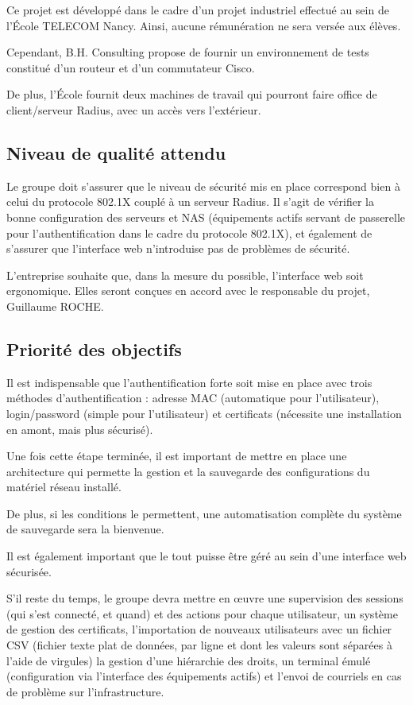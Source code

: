 Ce projet est développé dans le cadre d'un projet industriel effectué au sein de l'École TELECOM Nancy. Ainsi, aucune rémunération ne sera versée aux élèves.

Cependant, B.H. Consulting propose de fournir un environnement de tests constitué d'un routeur et d'un commutateur Cisco.

De plus, l'École fournit deux machines de travail qui pourront faire office de client/serveur Radius, avec un accès vers l'extérieur.

\subsection{Niveau de qualité attendu}

Le groupe doit s'assurer que le niveau de sécurité mis en place correspond bien à celui du protocole 802.1X couplé à un serveur Radius. Il s'agit de vérifier la bonne configuration des serveurs et NAS (équipements actifs servant de passerelle pour l'authentification dans le cadre du protocole 802.1X), et également de s'assurer que l'interface web n'introduise pas de problèmes de sécurité.

L'entreprise souhaite que, dans la mesure du possible, l'interface web soit ergonomique. Elles seront conçues en accord avec le responsable du projet, Guillaume ROCHE.

\subsection{Priorité des objectifs}

Il est indispensable que l'authentification forte soit mise en place avec trois méthodes d'authentification : adresse MAC (automatique pour l'utilisateur), login/password (simple pour l'utilisateur) et certificats (nécessite une installation en amont, mais plus sécurisé).

Une fois cette étape terminée, il est important de mettre en place une architecture qui permette la gestion et la sauvegarde des configurations du matériel réseau installé.

De plus, si les conditions le permettent, une automatisation complète du système de sauvegarde sera la bienvenue.

Il est également important que le tout puisse être géré au sein d'une interface web sécurisée.

S'il reste du temps, le groupe devra mettre en \oe{}uvre une supervision des sessions (qui s'est connecté, et quand) et des actions pour chaque utilisateur, un système de gestion des certificats, l'importation de nouveaux utilisateurs avec un fichier CSV (fichier texte plat de données, par ligne et dont les valeurs sont séparées à l'aide de virgules) la gestion d'une hiérarchie des droits, un terminal émulé (configuration via l'interface des équipements actifs) et l'envoi de courriels en cas de problème sur l'infrastructure.

